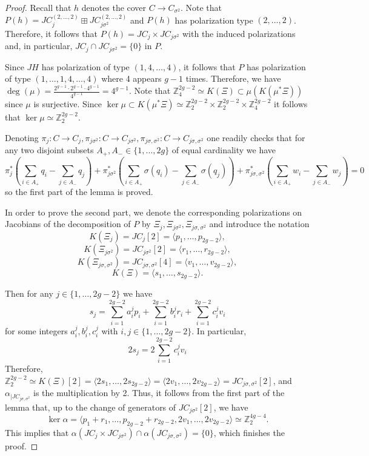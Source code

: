 \documentclass{article}
\numberwithin{equation}{section}
\newcommand{\s}{\sigma}
\begin{document}
\begin{proof}
    Recall that $h$ denotes the cover $C \to C_{\sigma^2}$. Note that $P(h) = JC_{j}^{(2,\ldots,2)} \boxplus JC_{j\sigma^2}^{(2,\ldots,2)}$ and $P(h)$ has polarization type $(2,\ldots,2)$. Therefore, it follows that $P(h) = JC_{j} \times JC_{j\sigma^2}$ with the induced polarizations and, in particular, $JC_{j} \cap JC_{j\sigma^2} = \{0\}$ in $P$.

    Since $JH$ has polarization of type $(1,4,\ldots, 4)$, it follows that $P$ has polarization of type $(1,\ldots, 1,4, \ldots, 4)$ where 4 appears $g-1$ times. Therefore, we have $\deg(\mu) = \frac{2^{g-1}\cdot 2^{g-1}\cdot 4^{g-1}}{4^{g-1}} = 4^{g-1}$. Note that $\mathbb{Z}_4^{2g-2} \simeq K(\Xi) \subset \mu(K(\mu^*\Xi))$ since $\mu$ is surjective. Since $\ker \mu \subset K(\mu^*\Xi) \simeq \mathbb{Z}_2^{2g-2} \times \mathbb{Z}_2^{2g-2} \times \mathbb{Z}_4^{2g-2}$
it follows that $\ker \mu \simeq \mathbb{Z}_2^{2g-2}$.

Denoting $\pi_j:C \to C_j, \pi_{j\sigma^2}: C \to C_{j\sigma^2}, \pi_{j\sigma, \sigma^2}: C \to C_{j\sigma, \sigma^2}$
    one readily checks that for any two disjoint subsets $A_+, A_- \in \{1,\ldots,2g\}$ of equal cardinality we have $$\pi_j^*\left(\sum_{i \in A_+} q_i - \sum_{j \in A_-} q_j\right) + \pi^*_{j\sigma^2}\left(\sum_{i \in A_+} \s(q_i) - \sum_{j \in A_-} \s(q_j)\right) + \pi_{j\sigma, \sigma^2}^*\left(\sum_{i \in A_+} w_i - \sum_{j \in A_-} w_j\right) = 0$$ so the first part of the lemma is proved. 

In order to prove the second part, we denote the corresponding polarizations on Jacobians of the decomposition of $P$ by $\Xi_{j}, \Xi_{j\sigma^2}, \Xi_{j\sigma,\sigma^2}$ and introduce the notation $$K(\Xi_{j}) = JC_{j}[2] = \langle p_1, \ldots, p_{2g-2} \rangle,$$
$$K(\Xi_{j\sigma^2}) = JC_{j\sigma^2}[2] = \langle r_1, \ldots, r_{2g-2} \rangle,$$
$$K(\Xi_{j\sigma, \sigma^2}) = JC_{j\s, \s^2}[4] = \langle v_1, \ldots, v_{2g-2} \rangle,$$
$$K(\Xi) =  \langle s_1, \ldots, s_{2g-2} \rangle.$$

Then for any $j \in \{1,\ldots, 2g-2\}$ we have $$s_j = \sum_{i=1}^{2g-2}a_i^jp_i + \sum_{i=1}^{2g-2}b_i^jr_i + \sum_{i=1}^{2g-2}c_i^jv_i$$ for some integers $a_i^j, b_i^j, c_i^j$ with $i, j \in \{1,\ldots, 2g-2\}$. In particular, $$2s_j =  2\sum_{i=1}^{2g-2}c_i^jv_i$$ Therefore, $\mathbb{Z}_2^{2g-2} \simeq K(\Xi)[2] = \langle 2s_1, \ldots, 2s_{2g-2}\rangle = \langle 2v_1, \ldots, 2v_{2g-2} \rangle = JC_{j\s, \s^2}[2]$, and $\alpha_{|JC_{j\s, \s^2}}$ is the multiplication by 2. Thus, it follows from the first part of the lemma that, up to the change of generators of $JC_{j\sigma^2}[2]$, we have  $$\ker \alpha = \langle p_1+r_1, \ldots, p_{2g-2}+r_{2g-2}, 2v_1, \ldots, 2v_{2g-2}\rangle \simeq \mathbb{Z}_2^{4g-4}.$$ This implies that $\alpha(JC_{j} \times JC_{j\s^2}) \cap \alpha(JC_{j\s,\s^2}) = \{0\}$, which finishes the proof.

\end{proof}
\end{document}
